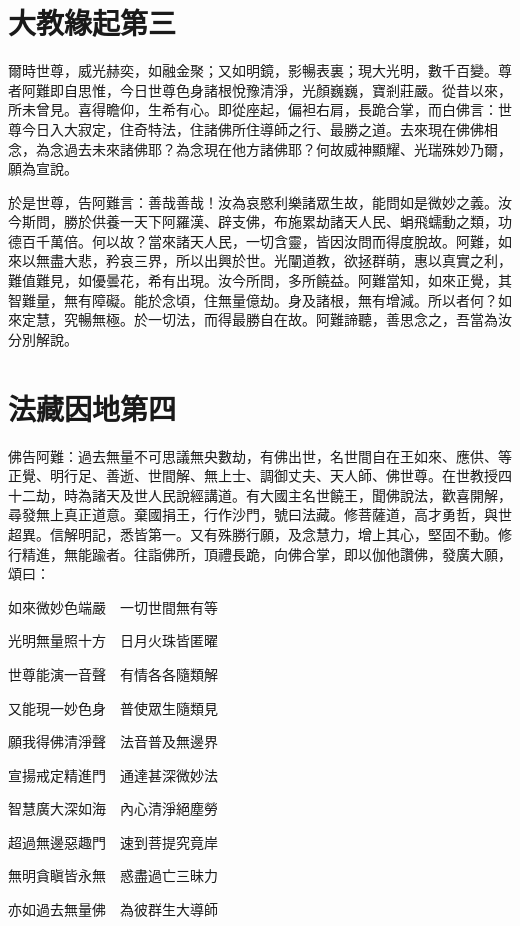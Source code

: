 \documentclass{zhvt-classic}
\begin{document}
\chapter*{大教緣起第三}

爾時世尊，威光赫奕，如融金聚；又如明鏡，影暢表裏；現大光明，數千百變。尊者阿難即自思惟，今日世尊色身諸根悅豫清淨，光顏巍巍，寶剎莊嚴。從昔以來，所未曾見。喜得瞻仰，生希有心。即從座起，偏袒右肩，長跪合掌，而白佛言：世尊今日入大寂定，住奇特法，住諸佛所住導師之行、最勝之道。去來現在佛佛相念，為念過去未來諸佛耶？為念現在他方諸佛耶？何故威神顯耀、光瑞殊妙乃爾，願為宣說。

於是世尊，告阿難言：善哉善哉！汝為哀愍利樂諸眾生故，能問如是微妙之義。汝今斯問，勝於供養一天下阿羅漢、辟支佛，布施累劫諸天人民、蜎飛蠕動之類，功德百千萬倍。何以故？當來諸天人民，一切含靈，皆因汝問而得度脫故。阿難，如來以無盡大悲，矜哀三界，所以出興於世。光闡道教，欲拯群萌，惠以真實之利，難值難見，如優曇花，希有出現。汝今所問，多所饒益。阿難當知，如來正覺，其智難量，無有障礙。能於念頃，住無量億劫。身及諸根，無有增減。所以者何？如來定慧，究暢無極。於一切法，而得最勝自在故。阿難諦聽，善思念之，吾當為汝分別解說。

\chapter*{法藏因地第四}

佛告阿難：過去無量不可思議無央數劫，有佛出世，名世間自在王如來、應供、等正覺、明行足、善逝、世間解、無上士、調御丈夫、天人師、佛世尊。在世教授四十二劫，時為諸天及世人民說經講道。有大國主名世饒王，聞佛說法，歡喜開解，尋發無上真正道意。棄國捐王，行作沙門，號曰法藏。修菩薩道，高才勇哲，與世超異。信解明記，悉皆第一。又有殊勝行願，及念慧力，增上其心，堅固不動。修行精進，無能踰者。往詣佛所，頂禮長跪，向佛合掌，即以伽他讚佛，發廣大願，頌曰：

如來微妙色端嚴　一切世間無有等

光明無量照十方　日月火珠皆匿曜

世尊能演一音聲　有情各各隨類解

又能現一妙色身　普使眾生隨類見

願我得佛清淨聲　法音普及無邊界

宣揚戒定精進門　通達甚深微妙法

智慧廣大深如海　內心清淨絕塵勞

超過無邊惡趣門　速到菩提究竟岸

無明貪瞋皆永無　惑盡過亡三昧力

亦如過去無量佛　為彼群生大導師
\end{document}
